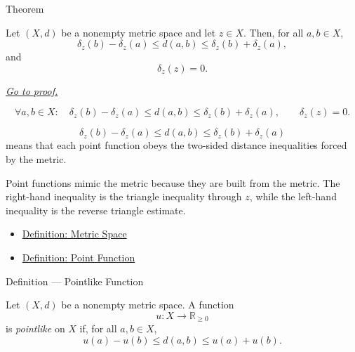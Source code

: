 \begin{theorembox}{Theorem}
\begin{theorem}
\label{thm:metric-point-function-inequalities}
Let \((X,d)\) be a nonempty metric space and let \(z\in X\).  Then, for all
\(a,b\in X\),
\[
  \delta_z(b)-\delta_z(a)\leq d(a,b)\leq \delta_z(b)+\delta_z(a),
\]
and
\[
  \delta_z(z)=0.
\]

\smallskip
\noindent
\hyperref[prf:metric-point-function-inequalities]{\textit{Go to proof.}}
\end{theorem}
\end{theorembox}


\begin{remark*}
\[
\forall a,b\in X{:}\quad
\delta_z(b)-\delta_z(a)\leq d(a,b)\leq \delta_z(b)+\delta_z(a),
\qquad
\delta_z(z)=0.
\]
\end{remark*}

\begin{remark*}
\[
\delta_z(b)-\delta_z(a)\leq d(a,b)\leq \delta_z(b)+\delta_z(a)
\]
means that each point function obeys the two-sided distance inequalities
forced by the metric.
\end{remark*}

\begin{remark*}[Interpretation]
Point functions mimic the metric because they are built from the metric.  The
right-hand inequality is the triangle inequality through \(z\), while the
left-hand inequality is the reverse triangle estimate.
\end{remark*}

\begin{dependencies}
\begin{itemize}
  \item \hyperref[def:metric-space]{Definition: Metric Space}
  \item \hyperref[def:metric-point-function]{Definition: Point Function}
\end{itemize}
\end{dependencies}

\begin{definitionbox}{Definition --- Pointlike Function}
\begin{definition}\label{def:metric-pointlike-function}
Let \((X,d)\) be a nonempty metric space.  A function
\[
  u:X\to\mathbb{R}_{\geq 0}
\]
is \emph{pointlike} on \(X\) if, for all \(a,b\in X\),
\[
  u(a)-u(b)\leq d(a,b)\leq u(a)+u(b).
\]
\end{definition}
\end{definitionbox}

